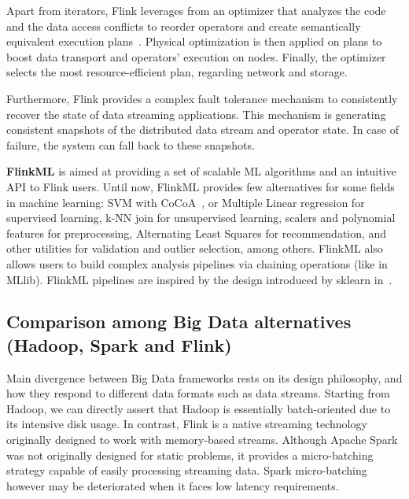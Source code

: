 \documentclass[3p,review]{elsarticle}
\begin{document}
	Apart from iterators, Flink leverages from an optimizer that analyzes the code and the data access conflicts to reorder operators and create semantically equivalent execution plans~\cite{Alexandrov14,Hues12}. Physical optimization is then applied on plans to boost data transport and operators' execution on nodes. Finally, the optimizer selects the most resource-efficient plan, regarding network and storage.
	
	Furthermore, Flink provides a complex fault tolerance mechanism to consistently recover the state of data streaming applications. This mechanism is generating consistent snapshots of the distributed data stream and operator state. In case of failure, the system can fall back to these snapshots.
	
	\textbf{FlinkML} is aimed at providing a set of scalable ML algorithms and an intuitive API to Flink users. Until now, FlinkML provides few alternatives for some fields in machine learning: SVM with CoCoA~\cite{jaggi14}, or Multiple Linear regression for supervised learning, k-NN join for unsupervised learning, scalers and polynomial features for preprocessing, Alternating Least Squares for recommendation, and other utilities for validation and outlier selection, among others. FlinkML also allows users to build complex analysis pipelines via chaining operations (like in MLlib). FlinkML pipelines are inspired by the design introduced by sklearn in~\cite{buitin13}.
	
	
	\subsection{Comparison among Big Data alternatives (Hadoop, Spark and Flink)}\label{subsec:spark}
	
	Main divergence between Big Data frameworks rests on its design philosophy, and how they respond to different data formats such as data streams. Starting from Hadoop, we can directly assert that Hadoop is essentially batch-oriented due to its intensive disk usage. In contrast, Flink is a native streaming technology originally designed to work with memory-based streams. Although Apache Spark was not originally designed for static problems, it provides a micro-batching strategy capable of easily processing streaming data. Spark micro-batching however may be deteriorated when it faces low latency requirements. %
	
\end{document}

